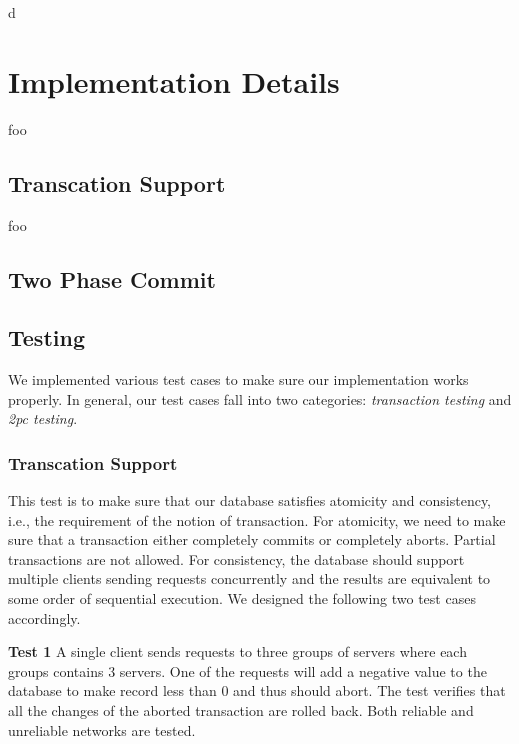\documentclass{vldb}
\begin{document}
d



\section{Implementation Details}

foo

\subsection{Transcation Support}

foo

\subsection{Two Phase Commit}

\subsection{Testing}

We implemented various test cases to make sure our implementation 
works properly. In general, our test cases fall into two categories: 
\textit{transaction testing} and \textit{2pc testing}. 

\subsubsection{Transcation Support}

This test is to make sure that our database satisfies atomicity and 
consistency, i.e., the requirement of the notion of transaction. For 
atomicity, we need to make sure that a transaction either completely 
commits or completely aborts. Partial transactions are not allowed.  
For consistency, the database should support multiple clients sending 
requests concurrently and the results are equivalent to some order of 
sequential execution. We designed the following two test cases 
accordingly.

\textbf{Test 1} A single client sends requests to three groups of 
servers where each groups contains 3 servers. One of the requests
will add a negative value to the database to make record less than 0 
and thus should abort. The test verifies that all the changes of the 
aborted transaction are rolled back. Both reliable and unreliable 
networks are tested.
\end{document}
